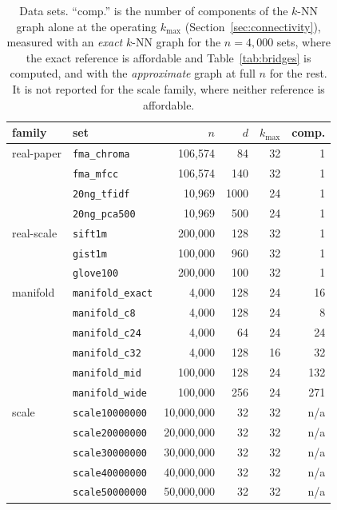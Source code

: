 \documentclass{ieeeaccess}
\newcommand{\kmax}{k_{\max}}
\begin{document}
\begin{table}[!t]
\caption{Data sets. ``comp.'' is the number of components of the $k$-NN graph
alone at the operating $\kmax$ (Section~\ref{sec:connectivity}), measured with
an \emph{exact} $k$-NN graph for the $n = 4{,}000$ sets, where the exact
reference is affordable and Table~\ref{tab:bridges} is computed, and with the
\emph{approximate} graph at full $n$ for the rest. It is not reported for the
scale family, where neither reference is affordable.}
\label{tab:datasets}
\centering
\footnotesize
\begin{tabular}{@{}llrrrr@{}}
\toprule
family & set & $n$ & $d$ & $\kmax$ & comp. \\
\midrule
real-paper & \texttt{fma\_chroma}   & 106{,}574 & 84   & 32 & 1 \\
           & \texttt{fma\_mfcc}     & 106{,}574 & 140  & 32 & 1 \\
           & \texttt{20ng\_tfidf}   & 10{,}969  & 1000 & 24 & 1 \\
           & \texttt{20ng\_pca500}  & 10{,}969  & 500  & 24 & 1 \\
\midrule
real-scale & \texttt{sift1m}        & 200{,}000 & 128  & 32 & 1 \\
           & \texttt{gist1m}        & 100{,}000 & 960  & 32 & 1 \\
           & \texttt{glove100}      & 200{,}000 & 100  & 32 & 1 \\
\midrule
manifold   & \texttt{manifold\_exact} & 4{,}000   & 128 & 24 & 16 \\
           & \texttt{manifold\_c8}    & 4{,}000   & 128 & 24 & 8  \\
           & \texttt{manifold\_c24}   & 4{,}000   & 64  & 24 & 24 \\
           & \texttt{manifold\_c32}   & 4{,}000   & 128 & 16 & 32 \\
           & \texttt{manifold\_mid}   & 100{,}000 & 128 & 24 & 132 \\
           & \texttt{manifold\_wide}  & 100{,}000 & 256 & 24 & 271 \\
\midrule
scale      & \texttt{scale10000000} & 10{,}000{,}000 & 32 & 32 & n/a \\
           & \texttt{scale20000000} & 20{,}000{,}000 & 32 & 32 & n/a \\
           & \texttt{scale30000000} & 30{,}000{,}000 & 32 & 32 & n/a \\
           & \texttt{scale40000000} & 40{,}000{,}000 & 32 & 32 & n/a \\
           & \texttt{scale50000000} & 50{,}000{,}000 & 32 & 32 & n/a \\
\bottomrule
\end{tabular}
\end{table}
\end{document}
